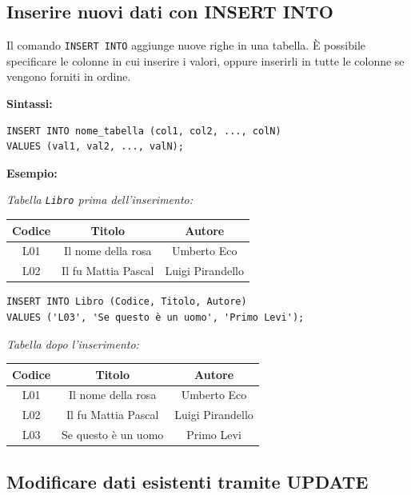 \documentclass[a4paper,12pt]{article}
\newcommand{\code}[1]{\texttt{#1}}
\begin{document}
\subsection{Inserire nuovi dati con INSERT INTO}

Il comando \code{INSERT INTO} aggiunge nuove righe in una tabella. È possibile specificare le colonne in cui inserire i valori, oppure inserirli in tutte le colonne se vengono forniti in ordine. 

\textbf{Sintassi:}
\begin{verbatim}
INSERT INTO nome_tabella (col1, col2, ..., colN)
VALUES (val1, val2, ..., valN);
\end{verbatim}

\textbf{Esempio:}

\textit{Tabella \texttt{Libro} prima dell'inserimento:}
\begin{center}
\begin{tabular}{|c|c|c|}
\hline
Codice & Titolo & Autore \\
\hline
L01 & Il nome della rosa & Umberto Eco \\
L02 & Il fu Mattia Pascal & Luigi Pirandello \\
\hline
\end{tabular}
\end{center}

\begin{verbatim}
INSERT INTO Libro (Codice, Titolo, Autore)
VALUES ('L03', 'Se questo è un uomo', 'Primo Levi');
\end{verbatim}

\textit{Tabella dopo l'inserimento:}
\begin{center}
\begin{tabular}{|c|c|c|}
\hline
Codice & Titolo & Autore \\
\hline
L01 & Il nome della rosa & Umberto Eco \\
L02 & Il fu Mattia Pascal & Luigi Pirandello \\
L03 & Se questo è un uomo & Primo Levi \\
\hline
\end{tabular}
\end{center}

\subsection{Modificare dati esistenti tramite UPDATE}
\end{document}
